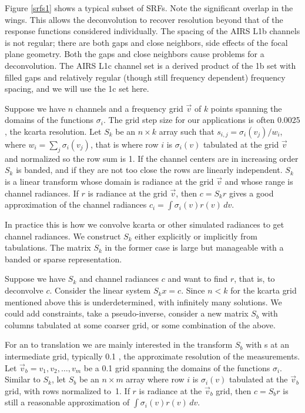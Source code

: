 \documentclass[12pt]{article}
\begin{document}
Figure \ref{srfs1} shows a typical subset of {\airs} SRFs.  Note the
significant overlap in the wings.  This allows the deconvolution to
recover resolution beyond that of the response functions considered
individually.  The spacing of the AIRS L1b channels is not regular;
there are both gaps and close neighbors, side effects of the focal
plane geometry.  Both the gaps and close neighbors cause problems for
a deconvolution.  The AIRS L1c channel set \cite{airs1c} is a derived
product of the 1b set with filled gaps and relatively regular (though
still frequency dependent) frequency spacing, and we will use the 1c
set here.

Suppose we have $n$ channels and a frequency grid $\vec v$ of $k$
points spanning the domains of the functions $\sigma_i$.  The grid
step size for our applications is often 0.0025 {\wn}, the kcarta
resolution.  Let $S_k$ be an $n\times k$ array such that $s_{i,j} =
\sigma_i(v_j)/w_i$, where $w_i = \sum_j \sigma_i(v_j)$, that is
where row $i$ is $\sigma_i(v)$ tabulated at the grid $\vec v$ and
normalized so the row sum is 1.  If the channel centers are in
increasing order $S_k$ is banded, and if they are not too close the
rows are linearly independent.  $S_k$ is a linear transform whose
domain is radiance at the grid $\vec v$ and whose range is channel
radiances.  If $r$ is radiance at the grid $\vec v$, then $c = S_k r$
gives a good approximation of the channel radiances $c_i = 
\int\sigma_i(v)r(v)\,dv$.

In practice this is how we convolve kcarta or other simulated
radiances to get {\airs} channel radiances.  We construct $S_k$
either explicitly or implicitly from {\airs} {\srf} tabulations.
The matrix $S_k$ in the former case is large but manageable with a
banded or sparse representation.

Suppose we have $S_k$ and channel radiances $c$ and want to 
find $r$, that is, to deconvolve $c$.  Consider the linear system
$S_k x = c$.  Since $n < k$ for the kcarta grid mentioned above this
is underdetermined, with infinitely many solutions.  We could add
constraints, take a pseudo-inverse, consider a new matrix $S_b$ with
columns tabulated at some coarser grid, or some combination of the
above.

For an {\airs} to {\cris} translation we are mainly interested in 
the transform $S_b$ with {\srf}s at an intermediate grid, typically
0.1 {\wn}, the approximate resolution of the {\srf} measurements.
Let $\vec v_b = v_1,v_2,\ldots,v_m$ be a 0.1 {\wn} grid spanning the
domains of the functions $\sigma_i$.  Similar to $S_k$, let $S_b$ be
an $n\times m$ array where row $i$ is $\sigma_i(v)$ tabulated at the
$\vec v_b$ grid, with rows normalized to~1.  If $r$ is radiance at
the $\vec v_b$ grid, then $c = S_b r$ is still a reasonable
approximation of $\int\sigma_i(v)r(v)\,dv$.
\end{document}
